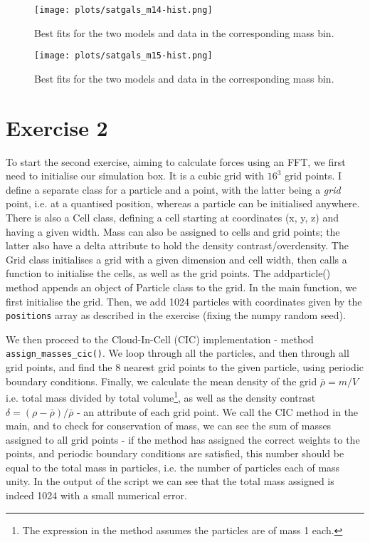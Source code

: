 \documentclass{article}
\begin{document}
\begin{figure}[!hb]
    \centering
    \texttt{[image: plots/satgals\_m14-hist.png]}
    \caption{Best fits for the two models and data in the corresponding mass bin.}
    \label{fig:my_label}
\end{figure}

\begin{figure}
    \centering
    \texttt{[image: plots/satgals\_m15-hist.png]}
    \caption{Best fits for the two models and data in the corresponding mass bin.}
    \label{fig:my_label}
\end{figure}

\newpage
\section{Exercise 2}
To start the second exercise, aiming to calculate forces using an FFT, we first need to initialise our simulation box. It is a cubic grid with $16^3$ grid points. I define a separate class for a particle and a point, with the latter being a \emph{grid} point, i.e. at a quantised position, whereas a particle can be initialised anywhere. There is also a Cell class, defining a cell starting at coordinates (x, y, z) and having a given width. Mass can also be assigned to cells and grid points; the latter also have a delta attribute to hold the density contrast/overdensity. The Grid class initialises a grid with a given dimension and cell width, then calls a function to initialise the cells, as well as the grid points. The add\textunderscore particle() method appends an object of Particle class to the grid. In the main function, we first initialise the grid. Then, we add 1024 particles with coordinates given by the \verb+positions+ array as described in the exercise (fixing the numpy random seed).

We then proceed to the Cloud-In-Cell (CIC) implementation - method \verb+assign_masses_cic()+. We loop through all the particles, and then through all grid points, and find the 8 nearest grid points to the given particle, using periodic boundary conditions. Finally, we calculate the mean density of the grid $\bar{\rho} = m/V$ i.e. total mass divided by total volume\footnote{The expression in the method assumes the particles are of mass 1 each.}, as well as the density contrast $\delta = (\rho-\bar{\rho})/\bar{\rho}$ - an attribute of each grid point. We call the CIC method in the main, and to check for conservation of mass, we can see the sum of masses assigned to all grid points - if the method has assigned the correct weights to the points, and periodic boundary conditions are satisfied, this number should be equal to the total mass in particles, i.e. the number of particles each of mass unity. In the output of the script we can see that the total mass assigned is indeed 1024 with a small numerical error.
\end{document}
